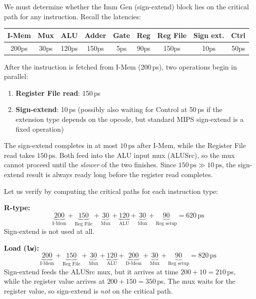We must determine whether the Imm Gen (sign-extend) block lies on the critical
path for any instruction. Recall the latencies:

\begin{center}
\begin{tabular}{ccccccccc}
\toprule
\textbf{I-Mem} & \textbf{Mux} & \textbf{ALU} & \textbf{Adder} &
\textbf{Gate} & \textbf{Reg} & \textbf{Reg File} &
\textbf{Sign ext.} & \textbf{Ctrl} \\
\midrule
200ps & 30ps & 120ps & 150ps & 5ps & 90ps & 150ps & 10ps & 50ps \\
\bottomrule
\end{tabular}
\end{center}

After the instruction is fetched from I-Mem (200\,ps), two operations begin in
parallel:
\begin{enumerate}
  \item \textbf{Register File read}: 150\,ps
  \item \textbf{Sign-extend}: 10\,ps (possibly also waiting for Control at
        50\,ps if the extension type depends on the opcode, but standard MIPS
        sign-extend is a fixed operation)
\end{enumerate}

The sign-extend completes in at most $10\,\text{ps}$ after I-Mem, while the
Register File read takes $150\,\text{ps}$. Both feed into the ALU input mux
(ALUSrc), so the mux cannot proceed until the \emph{slower} of the two
finishes. Since $150\,\text{ps} \gg 10\,\text{ps}$, the sign-extend result is
always ready long before the register read completes.

Let us verify by computing the critical paths for each instruction type:

\medskip\noindent\textbf{R-type:}
\[
  \underbrace{200}_{\text{I-Mem}} +
  \underbrace{150}_{\text{Reg File}} +
  \underbrace{30}_{\text{Mux}} +
  \underbrace{120}_{\text{ALU}} +
  \underbrace{30}_{\text{Mux}} +
  \underbrace{90}_{\text{Reg setup}}
  = 620\,\text{ps}
\]
Sign-extend is not used at all.

\medskip\noindent\textbf{Load (\texttt{lw}):}
\[
  \underbrace{200}_{\text{I-Mem}} +
  \underbrace{150}_{\text{Reg File}} +
  \underbrace{30}_{\text{Mux}} +
  \underbrace{120}_{\text{ALU}} +
  \underbrace{200}_{\text{D-Mem}} +
  \underbrace{30}_{\text{Mux}} +
  \underbrace{90}_{\text{Reg setup}}
  = 820\,\text{ps}
\]
Sign-extend feeds the ALUSrc mux, but it arrives at time $200 + 10 = 210$\,ps,
while the register value arrives at $200 + 150 = 350$\,ps. The mux waits for
the register value, so sign-extend is \emph{not} on the critical path.

